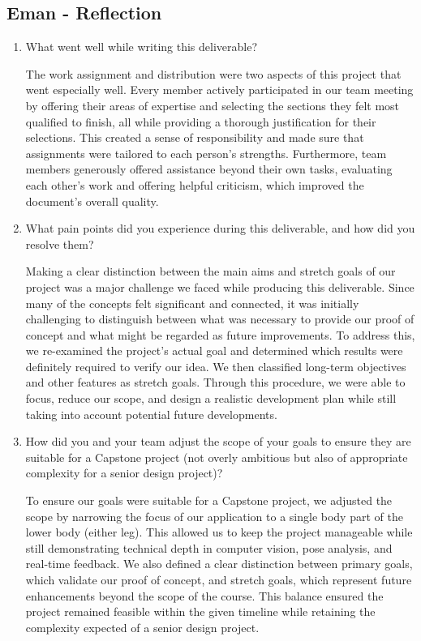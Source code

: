 \documentclass{article}
\begin{document}
\subsection*{Eman - Reflection}
\begin{enumerate}
    \item What went well while writing this deliverable? 

    The work assignment and distribution were two aspects of this project that went especially well. Every member actively
    participated in our team meeting by offering their areas of expertise and selecting the sections they felt most qualified
    to finish, all while providing a thorough justification for their selections. This created a sense of responsibility and
    made sure that assignments were tailored to each person's strengths. Furthermore, team members generously offered
    assistance beyond their own tasks, evaluating each other's work and offering helpful criticism, which improved the
    document's overall quality.

    \item What pain points did you experience during this deliverable, and how
    did you resolve them?

    Making a clear distinction between the main aims and stretch goals of our project was a major challenge we faced while
    producing this deliverable. Since many of the concepts felt significant and connected, it was initially challenging to
    distinguish between what was necessary to provide our proof of concept and what might be regarded as future improvements.
    To address this, we re-examined the project's actual goal and determined which results were definitely required to verify
    our idea. We then classified long-term objectives and other features as stretch goals. Through this procedure, we were
    able to focus, reduce our scope, and design a realistic development plan while still taking into account potential
    future developments.

    \item How did you and your team adjust the scope of your goals to ensure
    they are suitable for a Capstone project (not overly ambitious but also of
    appropriate complexity for a senior design project)?

    To ensure our goals were suitable for a Capstone project, we adjusted the scope by narrowing the focus of our application to a single body part of the lower body (either leg). 
    This allowed us to keep the project manageable while still demonstrating technical depth in computer vision, pose analysis,
    and real-time feedback. We also defined a clear distinction between primary goals, which validate our proof of concept,
    and stretch goals, which represent future enhancements beyond the scope of the course. This balance ensured the project
    remained feasible within the given timeline while retaining the complexity expected of a senior design project.
    
\end{enumerate}  
\end{document}
